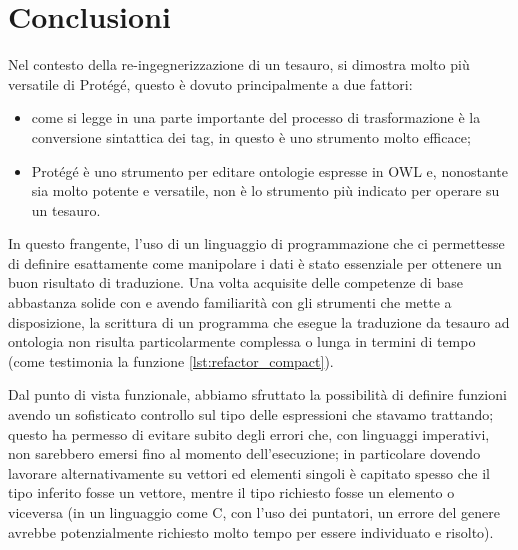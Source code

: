 \section{Conclusioni}
Nel contesto della re-ingegnerizzazione di un tesauro, \cduce si dimostra molto più versatile di Protégé, questo è dovuto principalmente a due fattori:
\begin{itemize}
	\item come si legge in \cite{re_engineeringThesaurus} una parte importante del processo di trasformazione è la conversione sintattica dei tag, in questo \cduce è uno strumento molto efficace;
	\item Protégé è uno strumento per editare ontologie espresse in OWL \cite{protege_doc} e, nonostante sia molto potente e versatile, non è lo strumento più indicato per operare su un tesauro.
\end{itemize}
In questo frangente, l'uso di un linguaggio di programmazione che ci permettesse di definire esattamente come manipolare i dati è stato essenziale per ottenere un buon risultato di traduzione. Una volta acquisite delle competenze di base abbastanza solide con \cduce e avendo familiarità con gli strumenti che mette a disposizione, la scrittura di un programma che esegue la traduzione da tesauro ad ontologia non risulta particolarmente complessa o lunga in termini di tempo (come testimonia la funzione \ref{lst:refactor_compact}).

Dal punto di vista funzionale, abbiamo sfruttato la possibilità di definire funzioni avendo un sofisticato controllo sul tipo delle espressioni che stavamo trattando; questo ha permesso di evitare subito degli errori che, con linguaggi imperativi, non sarebbero emersi fino al momento dell'esecuzione; in particolare dovendo lavorare alternativamente su vettori ed elementi singoli è capitato spesso che il tipo inferito fosse un vettore, mentre il tipo richiesto fosse un elemento o viceversa (in un linguaggio come C, con l'uso dei puntatori, un errore del genere avrebbe potenzialmente richiesto molto tempo per essere individuato e risolto).
